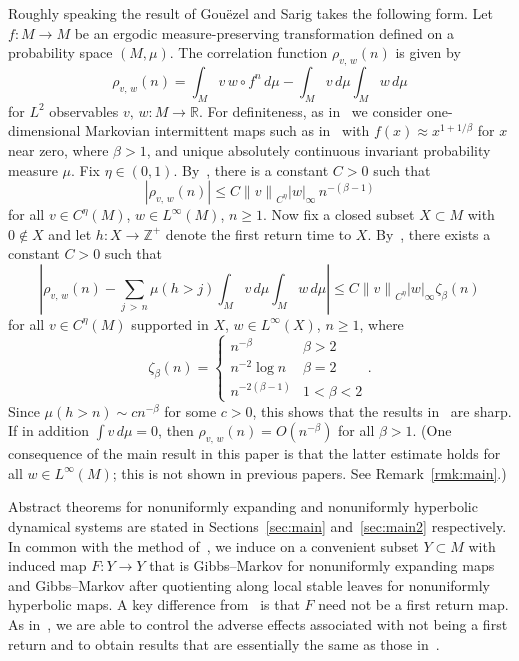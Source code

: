 \documentclass[AHL,Unicode,longabstracts,published]{cedram}
\newcommand{\R}{\mathbb{R}}
\newcommand{\Z}{\mathbb{Z}}
\begin{document}
Roughly speaking the result of Gou\"ezel and Sarig takes the following form. Let $f:M\to M$ be an ergodic measure-preserving transformation defined on a probability space $(M,\mu)$. The correlation function $\rho_{v,\,w}(n)$ is given by
\begin{equation}\label{eq:rho}
 \rho_{v,\,w}(n)=\int_M v\,w\circ f^n\,d\mu-\int_Mv\,d\mu\int_Mw\,d\mu
\end{equation}
for $L^2$ observables $v,\,w:M\to\R$. For definiteness, as in~\cite{Gouezel04a,Sarig02} we consider one-dimensional Markovian intermittent maps such as in~\cite{LSV99} with $f(x)\approx x^{1+1/\beta}$ for $x$ near zero, where $\beta>1$, and unique absolutely continuous invariant probability measure $\mu$. Fix $\eta\in(0,1)$. By~\cite{Young99}, there is a constant $C>0$ such that
\[
\left|\rho_{v,\,w}(n)\right|\le C{\|v\|}_{C^\eta}|w|_\infty\,n^{-(\beta-1)}
\]
for all $v\in C^\eta(M)$, $w\in L^\infty(M)$, $n\ge1$. Now fix a closed subset $X\subset M$ with $0\not\in X$ and let $h:X\to\Z^+$ denote the first return time to $X$. By~\cite{Gouezel04a,Sarig02}, there exists a constant $C>0$ such that
\begin{equation}\label{eq:GS}
 \left|\rho_{v,\,w}(n)-\sum_{j\,>\,n}\mu(h>j)\int_M v\,d\mu\int_M w\,d\mu
\right|\le C{\|v\|}_{C^\eta}|w|_\infty\zeta_\beta(n)
\end{equation}
for all $v\in C^\eta(M)$ supported in $X$, $w\in L^\infty(X)$, $n\ge1$, where
\begin{equation}\label{eq:zeta}
\zeta_\beta(n)=
\begin{cases}
n^{-\beta} & \beta>2 \\
n^{-2}\log n & \beta=2 \\
n^{-2(\beta-1)} & 1<\beta<2
\end{cases}.
\end{equation}
Since $\mu(h>n)\sim cn^{-\beta}$ for some $c>0$, this shows that the results in~\cite{Young99} are sharp. If in addition $\int v\,d\mu=0$, then $\rho_{v,\,w}(n)=O(n^{-\beta})$ for all $\beta>1$. (One consequence of the main result in this paper is that the latter estimate holds for all $w\in L^\infty(M)$; this is not shown in previous papers. See Remark~\ref{rmk:main}.)



Abstract theorems for nonuniformly expanding and nonuniformly hyperbolic dynamical systems are stated in Sections~\ref{sec:main} and~\ref{sec:main2} respectively. In common with the method of~\cite{Gouezel04a,Sarig02}, we induce on a convenient subset $Y\subset M$ with induced map $F:Y\to Y$ that is Gibbs--Markov for nonuniformly expanding maps and Gibbs--Markov after quotienting along local stable leaves for nonuniformly hyperbolic maps. A key difference from~\cite{Gouezel04a,Sarig02} is that $F$ need not be a first return map. As in~\cite{BruinTerhesiu18}, we are able to control the adverse effects associated with not being a first return and to obtain results that are essentially the same as those in~\cite{Gouezel04a,Sarig02}.
\end{document}
